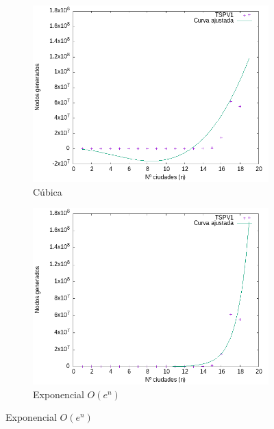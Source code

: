 \documentclass{article}
\begin{document}
\begin{figure}[H]
    \centering
    \begin{subfigure}[b]{0.45\textwidth}
        \centering
        \includegraphics[width=\textwidth]{imagenes/cota1/eficiencia_nodos_bk/CurvaAjustada_n3.png}
        \caption{Cúbica}
    \end{subfigure}
    \begin{subfigure}[b]{0.45\textwidth}
        \centering
        \includegraphics[width=\textwidth]{imagenes/cota1/eficiencia_nodos_bk/CurvaAjustada_exp.png}
        \caption{Exponencial $O(e^{n})$}
    \end{subfigure}
\end{figure}
\end{document}
